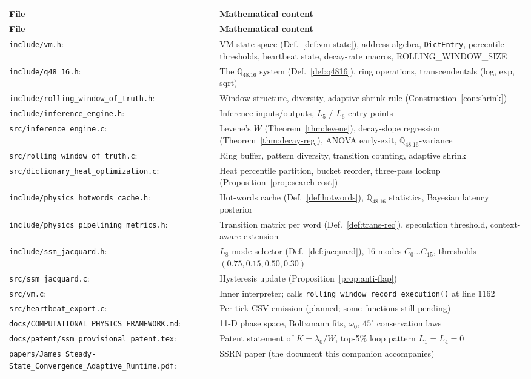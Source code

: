 \documentclass[11pt,letterpaper,openany]{book}
\theoremstyle{definition}
\theoremstyle{plain}
\newcommand{\Qfp}{\mathbb{Q}_{48.16}}                %
\newcommand{\Loop}[1]{L_{#1}}
\newcommand{\sourceref}[2]{\texttt{#1}:\texttt{#2}}
\begin{document}
\begin{longtable}{@{}p{} p{}@{}}
\toprule
\textbf{File} & \textbf{Mathematical content} \\
\midrule
\endfirsthead
\toprule \textbf{File} & \textbf{Mathematical content} \\ \midrule \endhead
\sourceref{include/vm.h}{} & VM state space (Def.~\ref{def:vm-state}),
  address algebra, \texttt{DictEntry}, percentile thresholds, heartbeat
  state, decay-rate macros, ROLLING\_WINDOW\_SIZE \\
\sourceref{include/q48\_16.h}{} & The $\Qfp$ system (Def.~\ref{def:q4816}),
  ring operations, transcendentals (log, exp, sqrt) \\
\sourceref{include/rolling\_window\_of\_truth.h}{} & Window structure,
  diversity, adaptive shrink rule (Construction~\ref{con:shrink}) \\
\sourceref{include/inference\_engine.h}{} & Inference inputs/outputs,
  $\Loop{5}$ / $\Loop{6}$ entry points \\
\sourceref{src/inference\_engine.c}{} & Levene's $W$ (Theorem~\ref{thm:levene}),
  decay-slope regression (Theorem~\ref{thm:decay-reg}), ANOVA early-exit,
  $\Qfp$-variance \\
\sourceref{src/rolling\_window\_of\_truth.c}{} & Ring buffer, pattern
  diversity, transition counting, adaptive shrink \\
\sourceref{src/dictionary\_heat\_optimization.c}{} & Heat percentile partition,
  bucket reorder, three-pass lookup (Proposition~\ref{prop:search-cost}) \\
\sourceref{include/physics\_hotwords\_cache.h}{} & Hot-words cache
  (Def.~\ref{def:hotwords}), $\Qfp$ statistics, Bayesian latency posterior \\
\sourceref{include/physics\_pipelining\_metrics.h}{} & Transition matrix
  per word (Def.~\ref{def:trans-rec}), speculation threshold,
  context-aware extension \\
\sourceref{include/ssm\_jacquard.h}{} & $\Loop{8}$ mode selector
  (Def.~\ref{def:jacquard}), 16 modes $C_0\dots C_{15}$, thresholds
  $(0.75, 0.15, 0.50, 0.30)$ \\
\sourceref{src/ssm\_jacquard.c}{} & Hysteresis update
  (Proposition~\ref{prop:anti-flap}) \\
\sourceref{src/vm.c}{} & Inner interpreter; calls
  \texttt{rolling\_window\_record\_execution()} at line $1162$ \\
\sourceref{src/heartbeat\_export.c}{} & Per-tick CSV emission (planned;
  some functions still pending) \\
\sourceref{docs/COMPUTATIONAL\_PHYSICS\_FRAMEWORK.md}{} & 11-D phase space,
  Boltzmann fits, $\omega_0$, $45^\circ$ conservation laws \\
\sourceref{docs/patent/ssm\_provisional\_patent.tex}{} & Patent statement of
  $K = \lambda_0/W$, top-5\% loop pattern $\Loop{1}=\Loop{4}=0$ \\
\sourceref{papers/James\_Steady-State\_Convergence\_Adaptive\_Runtime.pdf}{} &
  SSRN paper (the document this companion accompanies) \\
\bottomrule
\end{longtable}
\end{document}
